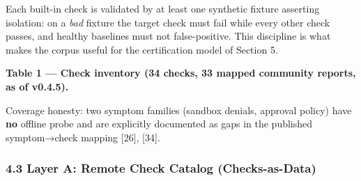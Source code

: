 \documentclass[
]{article}
\begin{document}
Each built-in check is validated by at least one synthetic fixture
asserting isolation: on a \emph{bad} fixture the target check must fail
while every other check passes, and healthy baselines must not
false-positive. This discipline is what makes the corpus useful for the
certification model of Section 5.

\textbf{Table 1 --- Check inventory (34 checks, 33 mapped community
reports, as of v0.4.5).}

\begin{table}[H]
\centering
\caption{Check inventory (34 checks, 33 mapped community reports, v0.4.5).}
\label{tab:checks}
\end{table}

Coverage honesty: two symptom families (sandbox denials, approval
policy) have \textbf{no} offline probe and are explicitly documented as
gaps in the published symptom→check mapping {[}26{]}, {[}34{]}.

\subsubsection{4.3 Layer A: Remote Check Catalog
(Checks-as-Data)}\label{layer-a-remote-check-catalog-checks-as-data}
\end{document}
